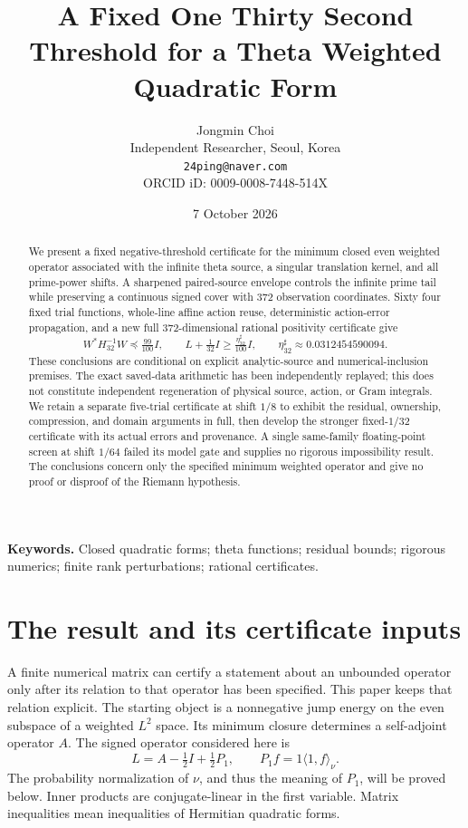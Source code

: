 \documentclass[11pt,a4paper]{article}
\title{A Fixed One Thirty Second Threshold for a Theta Weighted Quadratic Form}
\author{Jongmin Choi \\ Independent Researcher, Seoul, Korea \\ \texttt{24ping@naver.com} \\ ORCID iD: 0009-0008-7448-514X}
\date{7 October 2026}
\numberwithin{equation}{section}
\theoremstyle{definition}\newtheorem{definition}[theorem]{Definition}
\theoremstyle{remark}\newtheorem{remark}[theorem]{Remark}
\newcommand{\ip}[2]{\langle #1,#2\rangle}
\begin{document}
\maketitle
\begin{abstract}
We present a fixed negative-threshold certificate for the minimum closed even weighted operator associated with the infinite theta source, a singular translation kernel, and all prime-power shifts. A sharpened paired-source envelope controls the infinite prime tail while preserving a continuous signed cover with 372 observation coordinates. Sixty four fixed trial functions, whole-line affine action reuse, deterministic action-error propagation, and a new full 372-dimensional rational positivity certificate give
\[
 W^*H_{32}^{-1}W\preceq\tfrac{99}{100}I,\qquad
 L+\tfrac1{32}I\ge\tfrac{\eta_{32}^{\sharp}}{100}I,
 \qquad \eta_{32}^{\sharp}\approx0.0312454590094.
\]
These conclusions are conditional on explicit analytic-source and numerical-inclusion premises. The exact saved-data arithmetic has been independently replayed; this does not constitute independent regeneration of physical source, action, or Gram integrals. We retain a separate five-trial certificate at shift $1/8$ to exhibit the residual, ownership, compression, and domain arguments in full, then develop the stronger fixed-$1/32$ certificate with its actual errors and provenance. A single same-family floating-point screen at shift $1/64$ failed its model gate and supplies no rigorous impossibility result. The conclusions concern only the specified minimum weighted operator and give no proof or disproof of the Riemann hypothesis.
\end{abstract}
\noindent\textbf{Keywords.} Closed quadratic forms; theta functions; residual bounds; rigorous numerics; finite rank perturbations; rational certificates.

\section{The result and its certificate inputs}\label{sec:scope}
A finite numerical matrix can certify a statement about an unbounded operator only after its relation to that operator has been specified. This paper keeps that relation explicit. The starting object is a nonnegative jump energy on the even subspace of a weighted $L^2$ space. Its minimum closure determines a self-adjoint operator $A$. The signed operator considered here is
\begin{equation}\label{eq:Lintro}
 L=A-\tfrac12 I+\tfrac12 P_1,
 \qquad P_1 f=1\ip{1}{f}_{\nu}.
\end{equation}
The probability normalization of $\nu$, and thus the meaning of $P_1$, will be proved below. Inner products are conjugate-linear in the first variable. Matrix inequalities mean inequalities of Hermitian quadratic forms.
\end{document}

